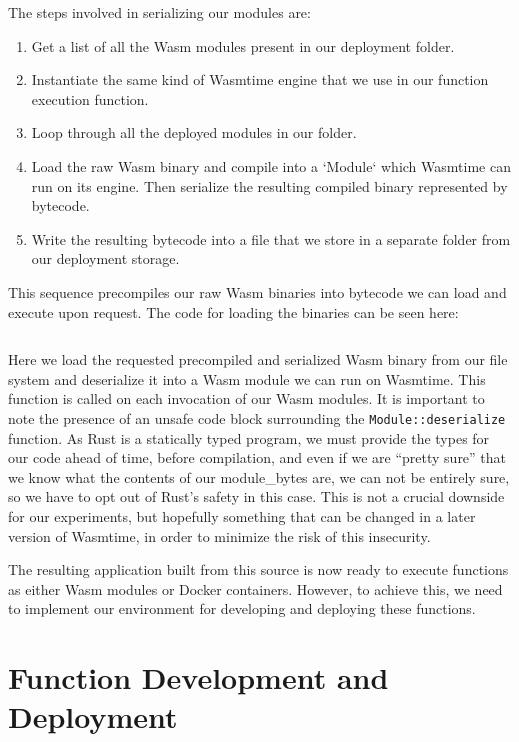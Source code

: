 \documentclass[
  table]{report}
\begin{document}
\inputminted{rust}{assets/code/serialize_wasm.rs}

The steps involved in serializing our modules are:

\renewcommand{\theenumi}{3.\arabic{enumi}}
\begin{enumerate}
  \item Get a list of all the \ac{Wasm} modules present in our deployment folder.
  \item Instantiate the same kind of Wasmtime engine that we use in our function execution function.
  \item Loop through all the deployed modules in our folder.
  \item Load the raw \ac{Wasm} binary and compile into a `Module` which Wasmtime can run on its engine. Then serialize the resulting compiled binary represented by bytecode.
  \item Write the resulting bytecode into a file that we store in a separate folder from our deployment storage.
\end{enumerate}

This sequence precompiles our raw \ac{Wasm} binaries into bytecode we
can load and execute upon request. The code for loading the binaries can
be seen here:

\inputminted{rust}{assets/code/load_wasm.rs}

Here we load the requested precompiled and serialized \ac{Wasm} binary
from our file system and deserialize it into a \ac{Wasm} module we can
run on Wasmtime. This function is called on each invocation of our
\ac{Wasm} modules. It is important to note the presence of an unsafe
code block surrounding the \texttt{Module::deserialize} function. As
Rust is a statically typed program, we must provide the types for our
code ahead of time, before compilation, and even if we are ``pretty
sure'' that we know what the contents of our module\_bytes are, we can
not be entirely sure, so we have to opt out of Rust's safety in this
case. This is not a crucial downside for our experiments, but hopefully
something that can be changed in a later version of Wasmtime, in order
to minimize the risk of this insecurity.

The resulting application built from this source is now ready to execute
functions as either \ac{Wasm} modules or Docker containers. However, to
achieve this, we need to implement our environment for developing and
deploying these functions.

\section{Function Development and Deployment}
\end{document}
